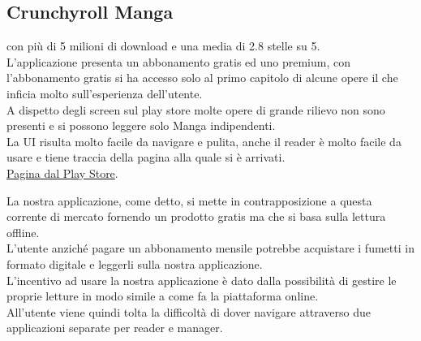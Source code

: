 \documentclass[../Assignment-3-LPSMT.tex]{subfiles}
\begin{document}
\begin{itemize}
	      \section{Crunchyroll Manga} con più di 5 milioni di download e una media di 2.8 stelle su 5.\\
	      L'applicazione presenta un abbonamento gratis ed uno premium, con l'abbonamento gratis si ha accesso solo al primo capitolo di alcune opere il che inficia molto sull'esperienza dell'utente.\\
	      A dispetto degli screen sul play store molte opere di grande rilievo non sono presenti e si possono leggere solo Manga indipendenti.\\
	      La UI risulta molto facile da navigare e pulita, anche il reader è molto facile da usare e tiene traccia della pagina alla quale si è arrivati.\\
	     \href{https://play.google.com/store/apps/details?id=com.crunchyroll.crmanga}{Pagina dal Play Store}.
\end{itemize}

La nostra applicazione, come detto, si mette in contrapposizione a questa corrente di mercato fornendo un prodotto gratis ma che si basa sulla lettura offline.\\
L'utente anziché pagare un abbonamento mensile potrebbe acquistare i fumetti in formato digitale e leggerli sulla nostra applicazione.\\
L'incentivo ad usare la nostra applicazione è dato dalla possibilità di gestire le proprie letture in modo simile a come fa la piattaforma
online.\\
All'utente viene quindi tolta la difficoltà di dover navigare attraverso due applicazioni separate per reader e manager.
\end{document}
